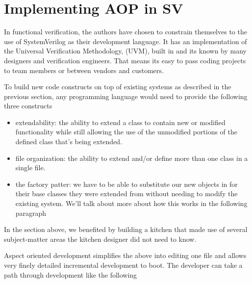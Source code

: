 \documentclass[twocolumn,letterpaper]{IEEEAerospaceCLS}  %
\begin{document}
\section{Implementing AOP in SV}
In functional verification, the authors have chosen to constrain themselves to the use of SystemVerilog as their development language. It has an implementation of the Universal Verification Methodology, (UVM), built in and its known by many designers and verification engineers. That means its easy to pass coding projects to team members or between vendors and customers. 

To build new code constructs on top of existing systems as described in the previous section, any programming language would need to provide the following three constructs

\begin{itemize}
    \item extendability: the ability to extend a class to contain new or modified functionality while still allowing the use of the unmodified portions of the defined class that's being extended.
    \item file organization: the ability to extend and/or define more than one class in a single file.
    \item the factory patter: we have to be able to substitute our new objects in for their base classes they were extended from without needing to modify the existing system. We'll talk about more about how this works in the following paragraph
    
\end{itemize}

In the section above, we benefited by building a kitchen that made use of several subject-matter areas the kitchen designer did not need to know. 

Aspect oriented development simplifies the above into editing one file and allows very finely detailed incremental development to boot.
The developer can take a path through development like the following
\end{document}
